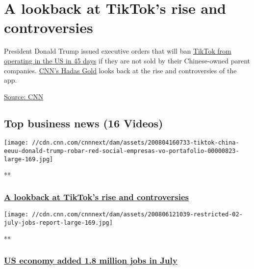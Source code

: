 \hypertarget{a-lookback-at-tiktoks-rise-and-controversies}{%
\section{A lookback at TikTok's rise and
controversies}\label{a-lookback-at-tiktoks-rise-and-controversies}}

President Donald Trump issued executive orders that will ban
\href{https://edition.cnn.com/2020/08/06/politics/trump-executive-order-tiktok/index.html}{TikTok
from operating in the US in 45 days} if they are not sold by their
Chinese-owned parent companies.
\href{http://www.cnn.com/profiles/hadas-gold}{CNN's Hadas Gold} looks
back at the rise and controversies of the app.

\href{https://www.cnn.com/}{Source: CNN}

\hypertarget{top-business-news-16-videos}{%
\subsection{Top business news (16
Videos)}\label{top-business-news-16-videos}}

\href{/videos/tech/2020/08/07/trump-us-ban-tiktok-china-gold-intl-hnk-vpx.cnn}{}

\texttt{[image: //cdn.cnn.com/cnnnext/dam/assets/200804160733-tiktok-china-eeuu-donald-trump-robar-red-social-empresas-vo-portafolio-00000823-large-169.jpg]}

**

\hypertarget{a-lookback-at-tiktoks-rise-and-controversies-1}{%
\subsubsection{\texorpdfstring{\href{/videos/tech/2020/08/07/trump-us-ban-tiktok-china-gold-intl-hnk-vpx.cnn}{A
lookback at TikTok's rise and
controversies}}{A lookback at TikTok's rise and controversies}}\label{a-lookback-at-tiktoks-rise-and-controversies-1}}

\href{/videos/business/2020/08/07/july-jobs-report.cnnbusiness/video/playlists/business-news/}{}

\texttt{[image: //cdn.cnn.com/cnnnext/dam/assets/200806121039-restricted-02-july-jobs-report-large-169.jpg]}

**

\hypertarget{us-economy-added-18-million-jobs-in-july}{%
\subsubsection{\texorpdfstring{\href{/videos/business/2020/08/07/july-jobs-report.cnnbusiness/video/playlists/business-news/}{US
economy added 1.8 million jobs in
July}}{US economy added 1.8 million jobs in July}}\label{us-economy-added-18-million-jobs-in-july}}

